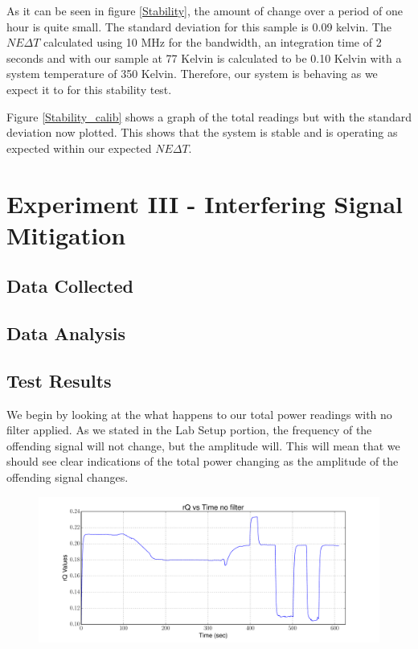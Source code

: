 {As it can be seen in figure \ref{Stability}, the amount of change over a period of one hour is quite small.  The standard deviation for this sample is 0.09 kelvin.  The $NE\Delta T$ calculated using 10 MHz for the bandwidth, an integration time of 2 seconds and with our sample at 77 Kelvin is calculated to be 0.10 Kelvin with a system temperature of 350 Kelvin.  Therefore, our system is behaving as we expect it to for this stability test.

Figure \ref{Stability_calib} shows a graph of the total readings but with the standard deviation now plotted.  This shows that the system is stable and is operating as expected within our expected $NE\Delta T$.

\section{Experiment III - Interfering Signal Mitigation} \label{Exp1_results}

\subsection{Data Collected}

\subsection{Data Analysis}
\subsection{Test Results}
We begin by looking at the what happens to our total power readings with no filter applied.  As we stated in the Lab Setup portion, the frequency of the offending signal will not change, but the amplitude will.  This will mean that we should see clear indications of the total power changing as the amplitude of the offending signal changes.  

\begin{figure}[h!tb] \centering

\includegraphics[width=\textwidth]{Experiments/Exp4/sdr_raw_unfiltered.pdf}


\end{figure}}

